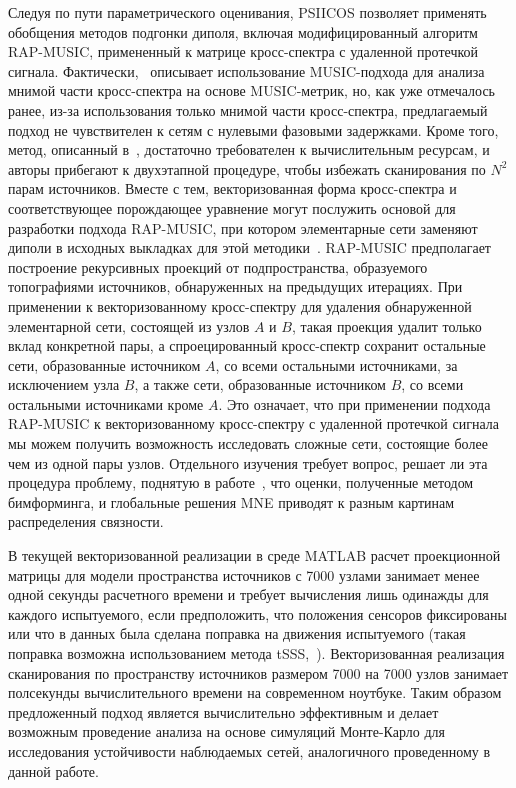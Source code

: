 Следуя по пути параметрического оценивания, PSIICOS позволяет применять
обобщения методов подгонки диполя, включая модифицированный алгоритм RAP-MUSIC,
примененный к матрице кросс-спектра с удаленной протечкой сигнала.
Фактически,~\cite{wedgemusic} описывает использование MUSIC-подхода для анализа
мнимой части кросс-спектра на основе MUSIC-метрик, но, как уже отмечалось
ранее, из-за использования только мнимой части кросс-спектра, предлагаемый
подход не чувствителен к сетям с нулевыми фазовыми задержками. Кроме того,
метод, описанный в~\cite{wedgemusic}, достаточно требователен к вычислительным
ресурсам, и авторы прибегают к двухэтапной процедуре, чтобы избежать
сканирования по $N^2$ парам источников. Вместе с тем, векторизованная форма
кросс-спектра и соответствующее порождающее уравнение могут послужить основой
для разработки подхода RAP-MUSIC, при котором элементарные сети заменяют диполи
в исходных выкладках для этой методики~\cite{Mosher1999}.  RAP-MUSIC
предполагает построение рекурсивных проекций от подпространства, образуемого
топографиями источников, обнаруженных на предыдущих итерациях. При применении к
векторизованному кросс-спектру для удаления обнаруженной элементарной сети,
состоящей из узлов $A$ и $B$, такая проекция удалит только вклад конкретной
пары, а спроецированный кросс-спектр сохранит остальные сети, образованные
источником $A$, со всеми остальными источниками, за исключением узла $B$, а
также сети, образованные источником $B$, со всеми остальными источниками кроме
$A$. Это означает, что при применении подхода RAP-MUSIC к векторизованному
кросс-спектру с удаленной протечкой сигнала мы можем получить возможность
исследовать сложные сети, состоящие более чем из одной пары узлов. Отдельного
изучения требует вопрос, решает ли эта процедура проблему, поднятую в
работе~\cite{Mahjoory2017}, что оценки, полученные методом бимформинга, и
глобальные решения MNE приводят к разным картинам распределения связности.

В текущей векторизованной реализации в среде MATLAB расчет проекционной матрицы
для модели пространства источников с 7000 узлами занимает менее одной секунды
расчетного времени и требует вычисления лишь одинажды для каждого испытуемого,
если предположить, что положения сенсоров фиксированы или что в данных была
сделана поправка на движения испытуемого (такая поправка возможна
использованием метода tSSS,~\cite{tSSS}).  Векторизованная реализация сканирования по
пространству источников размером 7000 на 7000 узлов занимает полсекунды
вычислительного времени на современном ноутбуке.  Таким образом предложенный
подход является вычислительно эффективным и делает возможным проведение анализа
на основе симуляций Монте-Карло для исследования устойчивости наблюдаемых
сетей, аналогичного проведенному в данной работе.

